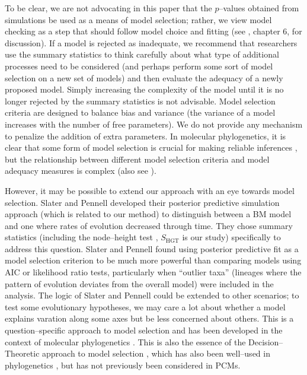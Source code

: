 \documentclass[a4paper,12pt]{article}
\begin{document}
To be clear, we are not advocating in this paper that the $p$--values obtained from simulations be used as a means of model selection; rather, we view model checking as a step that should follow model choice and fitting (see \citep{Gelmanbook}, chapter 6, for discussion). If a model is rejected as inadequate, we recommend that researchers use the summary statistics to think carefully about what type of additional processes need to be considered (and perhaps perform some sort of model selection on a new set of models) and then evaluate the adequacy of a newly proposed model. Simply increasing the complexity of the model until it is no longer rejected by the summary statistics is not advisable.  Model selection criteria are designed to balance bias and variance (the variance of a model increases with the number of free parameters). We do not provide any mechanism to penalize the addition of extra parameters. In molecular phylogenetics, it is clear that some form of model selection is crucial for making reliable inferences \citep{SullivanJoyce2005, Ripplinger2008}, but the relationship between different model selection criteria and model adequacy measures is complex \citep{Ripplinger2010} (also see \citep{Boettiger2012}). 

However, it may be possible to extend our approach with an eye towards model selection. Slater and Pennell \citep{SlaterPennell} developed their posterior predictive simulation approach (which is related to our method) to distinguish between a BM model and one where rates of evolution decreased through time. They chose summary statistics (including the node--height test \citep{FreckletonHarvey2006}, $S_{\text{HGT}}$ is our study) specifically to address this question. Slater and Pennell found using posterior predictive fit as a model selection criterion to be much more powerful than comparing models using AIC or likelihood ratio tests, particularly when ``outlier taxa'' (lineages where the pattern of evolution deviates from the overall model) were included in the analysis. The logic of Slater and Pennell could be extended to other scenarios; to test some evolutionary hypotheses, we may care a lot about whether a model explains varation along some axes but be less concerned about others. This is a question--specific approach to model selection and has been developed in the context of molecular phylogenetics \citep{Bollback2002, Lewis2013}. This is also the essence of the Decision--Theoretic approach to model selection \citep{Robert2007}, which has also been well--used in phylogenetics \citep{Minin2003}, but has not previously been considered in PCMs.
\end{document}
